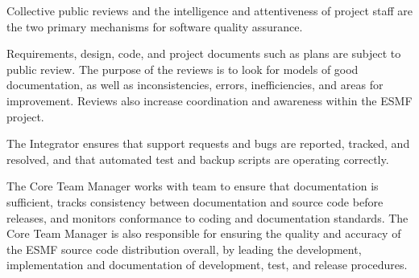 Collective public reviews and the intelligence and attentiveness of
project staff are the two primary mechanisms for software quality assurance.  

Requirements, design, code, and project documents such as plans
are subject to public review.  The purpose of the reviews is
to look for models of good documentation, as well as inconsistencies,
errors, inefficiencies, and areas for improvement.  Reviews also
increase coordination and awareness within the ESMF project.

The Integrator ensures that support requests
and bugs are reported, tracked, and resolved, and that automated
test and backup scripts are operating correctly.

The Core Team Manager works with team to ensure that documentation
is sufficient, tracks consistency between documentation and source
code before releases, and monitors conformance to coding and
documentation standards.  The Core Team Manager is also responsible
for ensuring the quality and accuracy of the ESMF source code
distribution overall, by leading the development,
implementation and documentation of development, test, and release
procedures.










